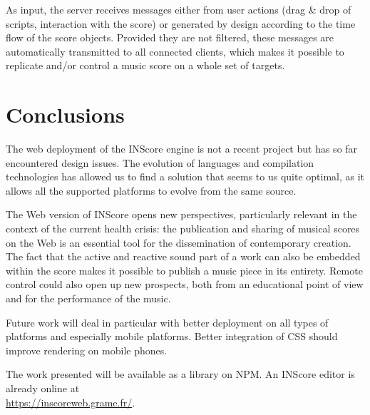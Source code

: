 \documentclass{article}
\begin{document}
As input, the server receives messages either from user actions (drag \& drop of scripts, interaction with the score) or generated by design according to the time flow of the score objects. Provided they are not filtered, these messages are automatically transmitted to all connected clients, which makes it possible to replicate and/or control a music score on a whole set of targets.


\section{Conclusions}

The web deployment of the INScore engine is not a recent project but has so far encountered design issues. The evolution of languages and compilation technologies has allowed us to find a solution that seems to us quite optimal, as it allows all the supported platforms to evolve from the same source.

The Web version of INScore opens new perspectives, particularly relevant in the context of the current health crisis: the publication and sharing of musical scores on the Web is an essential tool for the dissemination of contemporary creation. 
The fact that the active and reactive sound part of a work can also be embedded within the score makes it possible to publish a music piece in its entirety. Remote control could also open up new prospects, both from an educational point of view and for the performance of the music.

Future work will deal in particular with better deployment on all types of platforms and especially mobile platforms. Better integration of CSS should improve rendering on mobile phones.

The work presented will be available as a library on NPM. An INScore editor is already online at\\
\url{https://inscoreweb.grame.fr/}.


\balance

\end{document}
